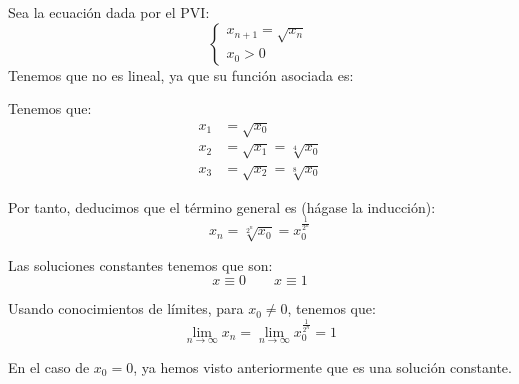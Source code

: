 \begin{ejemplo}
    Sea la ecuación dada por el PVI:
    \begin{equation*}
    \left\{ \begin{array}{l}
        x_{n+1} = \sqrt{x_n} \\
        x_0 >0
    \end{array}\right.
    \end{equation*}
    Tenemos que no es lineal, ya que su función asociada es:

    Tenemos que:
    \begin{align*}
        x_1 &= \sqrt{x_0}\\
        x_2 &= \sqrt{x_1} = \sqrt[4]{x_0}\\
        x_3 &= \sqrt{x_2} = \sqrt[8]{x_0}
    \end{align*}

    Por tanto, deducimos que el término general es (hágase la inducción):
    \begin{equation*}
        x_n = \sqrt[2^n]{x_0}
        =x_0^{\frac{1}{2^n}}
    \end{equation*}

    Las soluciones constantes tenemos que son:
    \begin{equation*}
        x\equiv 0 \qquad x\equiv 1
    \end{equation*}

    Usando conocimientos de límites, para $x_0\neq 0$, tenemos que:
    \begin{equation*}
        \lim_{n\to \infty}x_n = \lim_{n\to \infty} x_0^{\frac{1}{2^n}}=1
    \end{equation*}
    
    En el caso de $x_0 = 0$, ya hemos visto anteriormente que es una solución constante.
\end{ejemplo}


